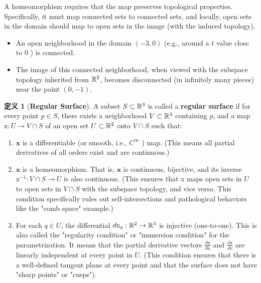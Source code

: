 \documentclass{ctexart}
\let\originalmathbb\mathbb
\renewcommand{\mathbb}[1]{%
    \ifstrequal{#1}{1}{\mathbbm{#1}}{\originalmathbb{#1}}%
}
\theoremstyle{plain}
\theoremstyle{definition}
\newtheorem{definition}[theorem]{定义}
\theoremstyle{remark}
\begin{document}
A homeomorphism requires that the map preserves topological properties. Specifically, it must map connected sets to connected sets, and locally, open sets in the domain should map to open sets in the image (with the induced topology).

\begin{itemize}
	\item An open neighborhood in the domain $(-3,0)$ (e.g., around a $t$ value close to 0 ) is connected.
	\item The image of this connected neighborhood, when viewed with the subspace topology inherited from $\mathbb{R}^2$, becomes disconnected (in infinitely many pieces) near the point $(0,-1)$.
\end{itemize}

\begin{definition}[\textbf{Regular Surface}]
A subset $S \subset \mathbb{R}^3$ is called a \textbf{regular surface} if for every point $p \in S$, there exists a neighborhood $V \subset \mathbb{R}^3$ containing $p$, and a map $\mathrm{x}: U \rightarrow V \cap S$ of an open set $U \subset \mathbb{R}^2$ onto $V \cap S$ such that:
	\begin{enumerate}
		\item $\mathbf{x}$ is a differentiable (or smooth, i.e., $C^{\infty}$ ) map. (This means all partial derivatives of all orders exist and are continuous.)
		\item $\mathbf{x}$ is a homeomorphism. That is, $\mathbf{x}$ is continuous, bijective, and its inverse $\mathrm{x}^{-1}: V \cap S \rightarrow U$ is also continuous. (This ensures that x maps open sets in $U$ to open sets in $V \cap S$ with the subspace topology, and vice versa. This condition specifically rules out self-intersections and pathological behaviors like the "comb space" example.)
		\item For each $q \in U$, the differential $d \mathrm{x}_q: \mathbb{R}^2 \rightarrow \mathbb{R}^3$ is injective (one-to-one). This is also called the "regularity condition" or "immersion condition" for the parametrization. It means that the partial derivative vectors $\frac{\partial \mathrm{x}}{\partial u}$ and $\frac{\partial \mathrm{x}}{\partial v}$ are linearly independent at every point in $U$. (This condition ensures that there is a well-defined tangent plane at every point and that the surface does not have "sharp points" or "cusps").
	\end{enumerate}\label{ff91ce}
\end{definition}
\end{document}
